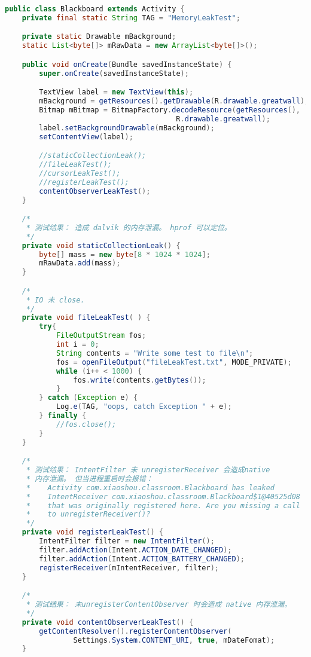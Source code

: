 \documentclass[a4paper,12pt]{article}
\begin{document}
\begin{lstlisting}[language=java,basicstyle=\scriptsize,caption=内存泄漏示例]
public class Blackboard extends Activity {
    private final static String TAG = "MemoryLeakTest";

    private static Drawable mBackground;
    static List<byte[]> mRawData = new ArrayList<byte[]>();

    public void onCreate(Bundle savedInstanceState) {
        super.onCreate(savedInstanceState);        

        TextView label = new TextView(this);
        mBackground = getResources().getDrawable(R.drawable.greatwall);
        Bitmap mBitmap = BitmapFactory.decodeResource(getResources(), 
                                        R.drawable.greatwall); 
        label.setBackgroundDrawable(mBackground); 
        setContentView(label); 

        //staticCollectionLeak();
        //fileLeakTest();
        //cursorLeakTest();
        //registerLeakTest();
        contentObserverLeakTest();
    }

    /*
     * 测试结果： 造成 dalvik 的内存泄漏。 hprof 可以定位。
     */
    private void staticCollectionLeak() {
        byte[] mass = new byte[8 * 1024 * 1024];
        mRawData.add(mass);
    }

    /*
     * IO 未 close. 
     */
    private void fileLeakTest( ) {
        try{
            FileOutputStream fos;
            int i = 0;
            String contents = "Write some test to file\n";
            fos = openFileOutput("fileLeakTest.txt", MODE_PRIVATE);
            while (i++ < 1000) {
                fos.write(contents.getBytes());
            }
        } catch (Exception e) {
            Log.e(TAG, "oops, catch Exception " + e);
        } finally {
            //fos.close();
        }
    }

    /*
     * 测试结果： IntentFilter 未 unregisterReceiver 会造成native
     * 内存泄漏。 但当进程重启时会报错：
     *    Activity com.xiaoshou.classroom.Blackboard has leaked
     *    IntentReceiver com.xiaoshou.classroom.Blackboard$1@40525d08
     *    that was originally registered here. Are you missing a call
     *    to unregisterReceiver()?
     */
    private void registerLeakTest() {
        IntentFilter filter = new IntentFilter();
        filter.addAction(Intent.ACTION_DATE_CHANGED);
        filter.addAction(Intent.ACTION_BATTERY_CHANGED);
        registerReceiver(mIntentReceiver, filter);
    }

    /*
     * 测试结果： 未unregisterContentObserver 时会造成 native 内存泄漏。
     */
    private void contentObserverLeakTest() {
        getContentResolver().registerContentObserver(
                Settings.System.CONTENT_URI, true, mDateFomat);
    }


\end{lstlisting}
\end{document}
